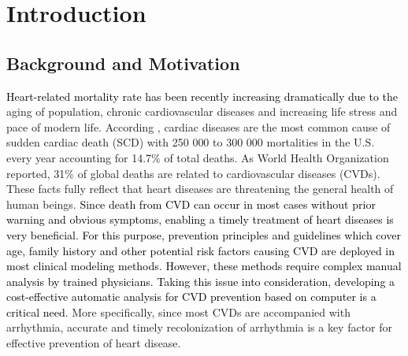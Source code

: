  \chapter{Introduction}

 \section{Background and Motivation}
 
\textcolor{black}{Heart-related mortality rate has been recently increasing dramatically due to the} aging of population, chronic cardiovascular diseases and increasing life stress and pace of modern life\cite{mortality}. According \cite{SCDnumber}, %
cardiac diseases are the most common cause of sudden cardiac death (SCD) with 250 000 to 300 000 mortalities in the U.S. every year accounting for 14.7\% of total deaths\cite{SCDnumber}. As World Health Organization reported, 31\% of global deaths are related to cardiovascular diseases (CVDs)\cite{who}. %
These facts fully reflect that heart diseases are threatening the general health of human beings. %
\textcolor{black}{Since death from CVD can occur in most cases without prior warning and obvious symptoms, enabling a timely treatment of heart diseases is very beneficial. For this purpose, prevention principles and guidelines which cover age, family history and other potential risk factors causing CVD are deployed in most clinical modeling methods\cite{smith2004principles}. However, these methods require complex manual analysis by trained physicians. Taking this issue into consideration, developing a cost-effective automatic analysis for CVD prevention based on computer is a critical need.}
More specifically, since most CVDs are accompanied with arrhythmia, accurate and timely recolonization of arrhythmia is a key factor for effective prevention of heart disease. %

